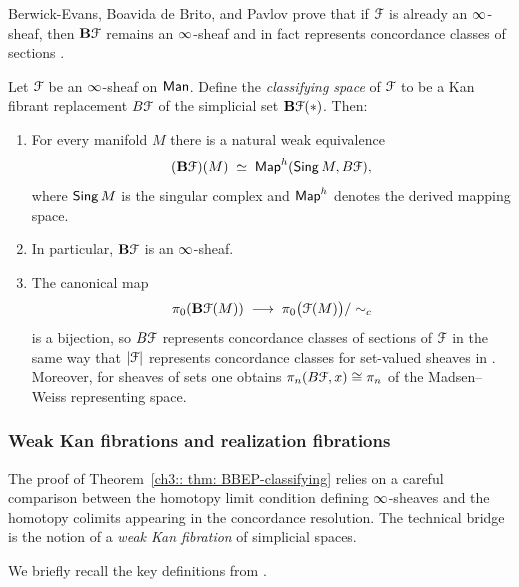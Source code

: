 Berwick-Evans, Boavida de Brito, and Pavlov prove that if $\mathcal F$ is already an $\operatorname{\infty}$-sheaf, then $\mathbf{B}\mathcal F$ remains an $\operatorname{\infty}$-sheaf and in fact represents concordance classes of sections \cite{BBEP24}.

\begin{theorem}\label{ch3:: thm: BBEP-classifying}
  {\cite[Theorems~1.1 and~1.2]{BBEP24}}
  Let $\mathcal F$ be an $\operatorname{\infty}$-sheaf on $\operatorname{\sf Man}$. Define the \emph{classifying space} of $\mathcal F$ to be a Kan fibrant replacement $B\mathcal F$ of the simplicial set $\mathbf{B}\mathcal F(*)$. Then:
  \begin{enumerate}
    \item For every manifold $M$ there is a natural weak equivalence
      \begin{equation}
        (\mathbf{B}\mathcal F)(M)\;\simeq\;
        \operatorname{{\sf Map}}^{h}(\operatorname{\mathsf{Sing}} M, B\mathcal F),
      \end{equation}
      where $\operatorname{\mathsf{Sing}} M$ is the singular complex and $\operatorname{{\sf Map}}^{h}$ denotes the
      derived mapping space.
    \item In particular, $\mathbf{B}\mathcal F$ is an $\operatorname{\infty}$-sheaf.
    \item The canonical map
      \[
        \pi_0(\mathbf{B}\mathcal F(M))\;\longrightarrow\;
        \pi_0\big(\mathcal F(M)\big)/\sim_c
      \]
      is a bijection, so $B\mathcal F$ represents concordance classes of sections of
      $\mathcal F$ in the same way that $|\mathcal F|$ represents concordance classes for
      set-valued sheaves in \cite{MW07}. Moreover, for sheaves of sets one
      obtains $\pi_n(B\mathcal F,x)\cong \pi_n$ of the Madsen--Weiss representing
      space.
  \end{enumerate}
\end{theorem}



\subsubsection{Weak Kan fibrations and realization fibrations}

The proof of Theorem~\ref{ch3:: thm: BBEP-classifying} relies on a careful
comparison between the homotopy limit condition defining $\operatorname{\infty}$-sheaves and
the homotopy colimits appearing in the concordance resolution. The technical
bridge is the notion of a \emph{weak Kan fibration} of simplicial spaces.

We briefly recall the key definitions from \cite[Section~3]{BBEP24}.

